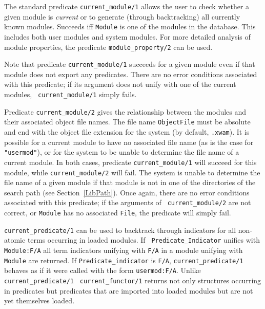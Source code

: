 \begin{description}
    The standard predicate {\tt current\_module/1} allows the user to
    check whether a given module is {\em current} or to generate
    (through backtracking) all currently known modules.  Succeeds iff
    {\tt Module} is one of the modules in the database. This includes
    both user modules and system modules.  For more detailed analysis
    of module properties, the predicate {\tt module\_property/2}
    can be used.

    Note that predicate {\tt current\_module/1} succeeds for a given
    module even if that module does not export any predicates. There
    are no error conditions associated with this predicate; if its
    argument does not unify with one of the current modules, {\tt
    current\_module/1} simply fails.

    Predicate {\tt current\_module/2} gives the relationship between
    the modules and their associated object file names. The file name
    {\tt ObjectFile} must be absolute and end with the object file
    extension for the system (by default, {\tt .xwam}).
%
    It is possible for a current module to have no associated file
    name (as is the case for {\tt "usermod"}), or for the system to be
    unable to determine the file name of a current module. In both
    cases, predicate {\tt current\_module/1} will succeed for this
    module, while {\tt current\_module/2} will fail. The system is
    unable to determine the file name of a given module if that module
    is not in one of the directories of the search path (see
    Section~\ref{LibPath}).  Once again, there are no error conditions
    associated with this predicate; if the arguments of {\tt
    current\_module/2} are not correct, or {\tt Module} has no
    associated {\tt File}, the predicate will simply fail.

{\tt current\_predicate/1} can be used to backtrack through indicators
for all non-atomic terms occurring in loaded modules.  If {\tt
Predicate\_Indicator} unifies with {\tt Module:F/A} all term
indicators unifying with {\tt F/A} in a module unifying with {\tt
Module} are returned.  If {\tt Predicate\_indicator} is {\tt F/A},
{\tt current\_predicate/1} behaves as if it were called with the form
{\tt usermod:F/A}.  Unlike {\tt current\_predicate/1} {\tt
current\_functor/1} returns not only structures occurring in
predicates but predicates that are imported into loaded modules but
are not yet themselves loaded.


\end{description}
